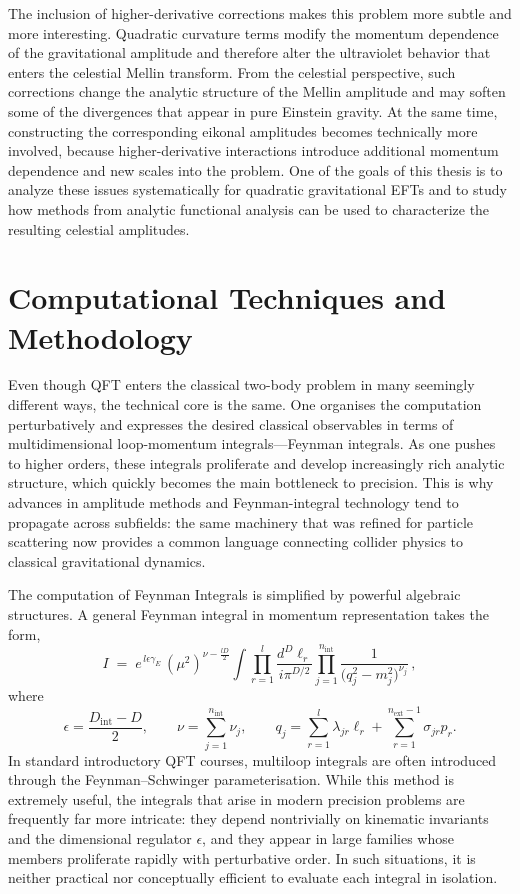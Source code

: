 {The inclusion of higher-derivative corrections makes this problem more subtle and more interesting. Quadratic curvature terms modify the momentum dependence of the gravitational amplitude and therefore alter the ultraviolet behavior that enters the celestial Mellin transform. From the celestial perspective, such corrections change the analytic structure of the Mellin amplitude and may soften some of the divergences that appear in pure Einstein gravity. At the same time, constructing the corresponding eikonal amplitudes becomes technically more involved, because higher-derivative interactions introduce additional momentum dependence and new scales into the problem. One of the goals of this thesis is to analyze these issues systematically for quadratic gravitational EFTs and to study how methods from analytic functional analysis can be used to characterize the resulting celestial amplitudes.}
\section{Computational Techniques and Methodology}
Even though QFT enters the classical two-body problem in many seemingly different ways, the technical core is the same. One organises the computation perturbatively and expresses the desired classical observables in terms of multidimensional loop-momentum integrals—Feynman integrals. As one pushes to higher orders, these integrals proliferate and develop increasingly rich analytic structure, which quickly becomes the main bottleneck to precision. This is why advances in amplitude methods and Feynman-integral technology tend to propagate across subfields: the same machinery that was refined for particle scattering now provides a common language connecting collider physics to classical gravitational dynamics.\par

The computation of Feynman Integrals is simplified by powerful algebraic structures. A general Feynman integral in momentum representation takes the form,
\begin{equation}
I \;=\; e^{\,l\epsilon\gamma_E}\,(\mu^2)^{\nu-\frac{lD}{2}}
\int \prod_{r=1}^{l}\frac{d^{D}\ell_r}{i\pi^{D/2}}
\prod_{j=1}^{n_{\text{int}}}\frac{1}{\bigl(q_j^{2}-m_j^{2}\bigr)^{\nu_j}}\,,
\tag{2.138}
\end{equation}
\noindent where
\begin{equation}
\epsilon=\frac{D_{\text{int}}-D}{2},
\qquad
\nu=\sum_{j=1}^{n_{\text{int}}}\nu_j,
\qquad
q_j=\sum_{r=1}^{l}\lambda_{jr}\ell_r+\sum_{r=1}^{n_{\text{ext}}-1}\sigma_{jr}p_r.
\tag{2.139}
\end{equation}
In standard introductory QFT courses, multiloop integrals are often introduced through the Feynman--Schwinger parameterisation. While this method is extremely useful, the integrals that arise in modern precision problems are frequently far more intricate: they depend nontrivially on kinematic invariants and the dimensional regulator $\epsilon$, and they appear in large families whose members proliferate rapidly with perturbative order. In such situations, it is neither practical nor conceptually efficient to evaluate each integral in isolation.  
